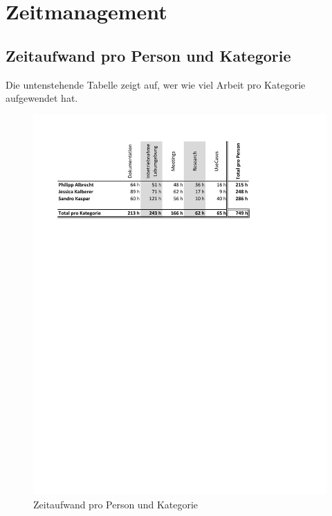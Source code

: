 \section{Zeitmanagement}

\subsection{Zeitaufwand pro Person und Kategorie}
Die untenstehende Tabelle zeigt auf, wer wie viel Arbeit pro Kategorie aufgewendet hat.
\begin{figure}[H]
	\centering
	\includegraphics[]{img/zeitaufwand/zeitaufwand_pro_person.pdf}
	\caption{Zeitaufwand pro Person und Kategorie}	\label{fig:zeitmanagement-person-kategorie}
\end{figure} 

